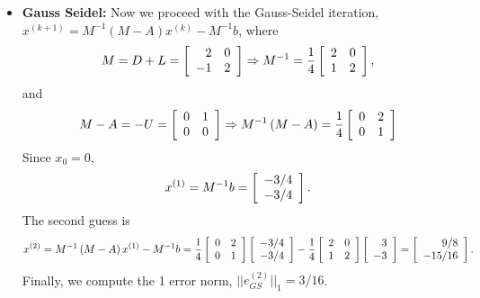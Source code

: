 \begin{questions}
\begin{solution}
\begin{itemize}
\item \textbf{Gauss Seidel:}
Now we proceed with the Gauss-Seidel iteration, $x^{(k+1)}=M^{-1}\left(M-A\right)x^{(k)}-M^{-1}b$, where
\begin{align*}
M=D+L=\left[
	\begin{array}{r r} 
	2 & 0 \\
	-1 & 2 \\
	\end{array} \right]\Rightarrow M^{-1}=\frac{1}{4}\left[
	\begin{array}{r r} 
	2 & 0 \\
	1 & 2 \\
	\end{array} \right],
\end{align*}
and 
\begin{align*}
M-A=-U=\left[
	\begin{array}{r r} 
	0 & 1 \\
	0 & 0 \\
	\end{array} \right]\Rightarrow M^{-1}\left(M-A\right)=\frac{1}{4}\left[
	\begin{array}{r r} 
	0 & 2 \\
	0 & 1 \\
	\end{array} \right]
\end{align*}
Since $x_0=0$,
\begin{align*}
x^{(1)}=M^{-1}b=\left[
	\begin{array}{r r} 
	-3/4 \\
	-3/4 \\
	\end{array} \right].
\end{align*}
The second guess is
\begin{align*}
x^{(2)}=M^{-1}\left(M-A\right)x^{(1)}-M^{-1}b=\frac{1}{4}\left[
	\begin{array}{r r} 
	0 & 2 \\
	0 & 1 \\
	\end{array} \right]\left[
	\begin{array}{r r} 
	-3/4 \\
	-3/4 \\
	\end{array} \right]-\frac{1}{4}\left[
	\begin{array}{r r} 
	2 & 0 \\
	1 & 2 \\
	\end{array} \right]\left[
	\begin{array}{r r} 
	3 \\
	-3 \\
	\end{array} \right]=\left[
	\begin{array}{r r} 
	9/8 \\
	-15/16 \\
	\end{array} \right].
\end{align*}
Finally, we compute the 1 error norm, $||e_{GS}^{(2)}||_1=3/16$.




\end{itemize}
\end{solution}
\end{questions}
